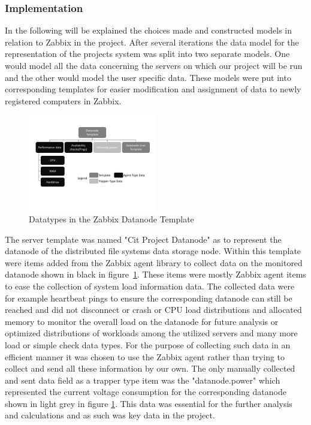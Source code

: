 \subsubsection{Implementation}
	In the following will be explained the choices made and constructed models in relation to Zabbix in the project.
	After several iterations the data model for the representation of the projects system was split into two separate models. One would model all the data concerning the servers on which our project will be run and the other would model the user specific data. These models were put into corresponding templates for easier modification and assignment of data to newly registered computers in Zabbix.
\begin{figure}[ht]
\centering
\includegraphics[width=0.5\textwidth]{img/ZabbixDatanodeTemp} 

\caption{Datatypes in the Zabbix Datanode Template}
\label{zabbix_datanode_template}
\end{figure}
	The server template was named "Cit Project Datanode" as to represent the datanode of the  distributed file systems data storage node. Within this template were items added from the Zabbix agent library to collect data on the monitored datanode shown in black in  figure~\ref{zabbix_datanode_template}. These items were mostly Zabbix agent items to ease the collection of system load information data. The collected data were for example heartbeat pings to ensure the corresponding datanode can still be reached and did not disconnect or crash or CPU load distributions and allocated memory to monitor the overall load on the datanode for future analysis or optimized distributions of workloads among the utilized servers and many more load or simple check data types. For the purpose of collecting such data in an efficient manner it was chosen to use the Zabbix agent rather than trying to collect and send all these information by our own. The only manually collected and sent data field as a trapper type item was the "datanode.power" which represented the current voltage consumption for the corresponding datanode shown in light grey in figure \ref{zabbix_datanode_template}. This data was essential for the further analysis and calculations and as such was key data in the project.
